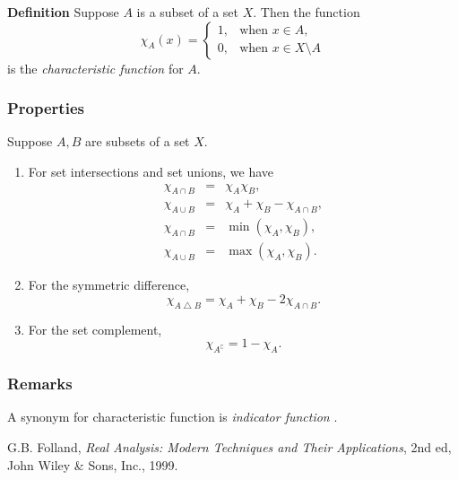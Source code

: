\documentclass{article}
\begin{document}
{\bf Definition} Suppose $A$ is a subset of a set $X$. Then the
function
\begin{equation*}
\chi_A(x) =
\begin{cases}
1,&\text{when }x\in A,\\
0,&\text{when }x\in X\setminus A
\end{cases}
\end{equation*}
is the \emph{characteristic function} for $A$.


\subsubsection{Properties}
Suppose $A,B$ are subsets of a set $X$.
\begin{enumerate}
\item For set intersections and set unions, we have
   \begin{eqnarray*}
   \chi_{A\cap B} &=& \chi_A \chi_B, \\
   \chi_{A\cup B} &=& \chi_A + \chi_B - \chi_{A\cap B},\\
   \chi_{A\cap B} &=& \min(\chi_A,\chi_B),\\
   \chi_{A\cup B} &=& \max(\chi_A,\chi_B).
   \end{eqnarray*}
\item For the symmetric difference,
$$\chi_{A\bigtriangleup B} = \chi_A + \chi_B - 2\chi_{A\cap B}.$$
\item For the set complement,
$$\chi_{A^\complement} = 1-\chi_A. $$
\end{enumerate}


\subsubsection{Remarks}
A synonym for characteristic function is \emph{indicator function}
\cite{folland}.


\begin{thebibliography}{9}
 G.B. Folland, \emph{Real Analysis: Modern Techniques and Their Applications}, 2nd ed, John Wiley \& Sons, Inc., 1999.
 \end{thebibliography}
\end{document}
